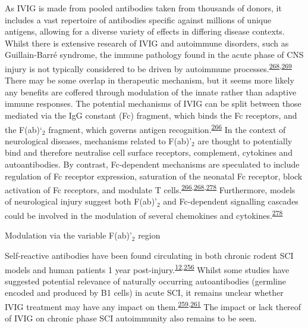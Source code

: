 \documentclass[
]{article}
\begin{document}
As IVIG is made from pooled antibodies taken from thousands of donors, it includes a vast repertoire of antibodies specific against millions of unique antigens, allowing for a diverse variety of effects in differing disease contexts.
Whilst there is extensive research of IVIG and autoimmune disorders, such as Guillain-Barré syndrome, the immune pathology found in the acute phase of CNS injury is not typically considered to be driven by autoimmune processes.\textsuperscript{\protect\hyperlink{ref-lunemann_intravenous_2015}{268},\protect\hyperlink{ref-stangel_intravenous_1998}{269}}
There may be some overlap in therapeutic mechanism, but it seems more likely any benefits are coffered through modulation of the innate rather than adaptive immune responses.
The potential mechanisms of IVIG can be split between those mediated via the IgG constant (Fc) fragment, which binds the Fc receptors, and the F(ab)`\(_2\) fragment, which governs antigen recognition.\textsuperscript{\protect\hyperlink{ref-schwab_intravenous_2013}{266}}
In the context of neurological diseases, mechanisms related to F(ab)'\(_2\) are thought to potentially bind and therefore neutralise cell surface receptors, complement, cytokines and autoantibodies.
By contrast, Fc-dependent mechanisms are speculated to include regulation of Fc receptor expression, saturation of the neonatal Fc receptor, block activation of Fc receptors, and modulate T cells.\textsuperscript{\protect\hyperlink{ref-schwab_intravenous_2013}{266},\protect\hyperlink{ref-lunemann_intravenous_2015}{268},\protect\hyperlink{ref-dalakas_mechanistic_2014}{278}}
Furthermore, models of neurological injury suggest both F(ab)'\(_2\) and Fc-dependent signalling cascades could be involved in the modulation of several chemokines and cytokines.\textsuperscript{\protect\hyperlink{ref-dalakas_mechanistic_2014}{278}}

Modulation via the variable F(ab)'\(_2\) region

Self-reactive antibodies have been found circulating in both chronic rodent SCI models and human patients 1 year post-injury.\textsuperscript{\protect\hyperlink{ref-hayes_elevated_2002}{12},\protect\hyperlink{ref-ankeny_b_2009}{256}}
Whilst some studies have suggested potential relevance of naturally occurring autoantibodies (germline encoded and produced by B1 cells) in acute SCI, it remains unclear whether IVIG treatment may have any impact on them.\textsuperscript{\protect\hyperlink{ref-palmers_antibody_2016}{259},\protect\hyperlink{ref-narang_natural_2017}{261}}
The impact or lack thereof of IVIG on chronic phase SCI autoimmunity also remains to be seen.
\end{document}
